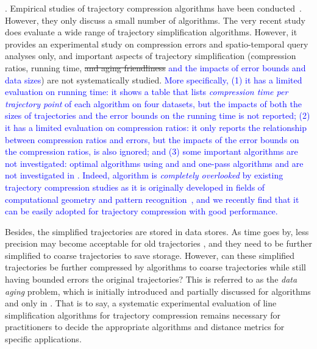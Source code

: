 {. Empirical studies of trajectory compression algorithms have been conducted~\cite{Muckell:Compression,MuckellHLR10,mThesis}. However, they only discuss a small number of algorithms. 
%
The very recent study \cite{Zhang:Evaluation} does evaluate a wide range of trajectory simplification algorithms.
However, it provides {an experimental study} on compression errors and spatio-temporal query analyses only, and important aspects of trajectory simplification (compression ratios, running time, \sout{and aging friendliness} \textcolor{blue}{and the impacts of error bounds and data sizes}) are not systematically studied. 
\textcolor{blue}{More specifically, }
\textcolor{blue}{(1) it has a limited evaluation on running time: it shows a table that lists \emph{compression time per trajectory point} of each algorithm on four datasets, but the impacts of both the sizes of trajectories and the error bounds on the running time is not reported;}
%
\textcolor{blue}{(2) it has a limited evaluation on compression ratios: it only reports the relationship between compression ratios and errors, but the impacts of the error bounds on the compression ratios, is also ignored; and }
%
\textcolor{blue}{(3) some important algorithms are not investigated: optimal algorithms using \ped and \sed and one-pass algorithms \siped and \cised are not investigated in \cite{Zhang:Evaluation}. Indeed, algorithm \siped is {\em completely overlooked} by existing trajectory compression studies as it is originally developed in fields of computational geometry and pattern recognition~\cite{Williams:Longest,Sklansky:Cone,Dunham:Cone, Zhao:Sleeve}, and we recently find that it can be easily adopted for trajectory compression with good performance.}%

Besides, the simplified trajectories are stored in data stores. As time goes by, less precision may become acceptable for old trajectories \cite{Cao:Spatio}, and they need to be further simplified to coarse trajectories to save storage. However, can these simplified trajectories be further compressed by \lsa algorithms to coarse trajectories while still having bounded errors \wrt the original trajectories? This is referred to as the \emph{data aging} problem, which is initially introduced and partially discussed for algorithms \opt and \dpa only in \cite{Cao:Spatio}.
That is to say, a systematic experimental evaluation of line simplification algorithms for trajectory compression remains necessary for practitioners to decide the appropriate algorithms and distance metrics for specific applications.


}
